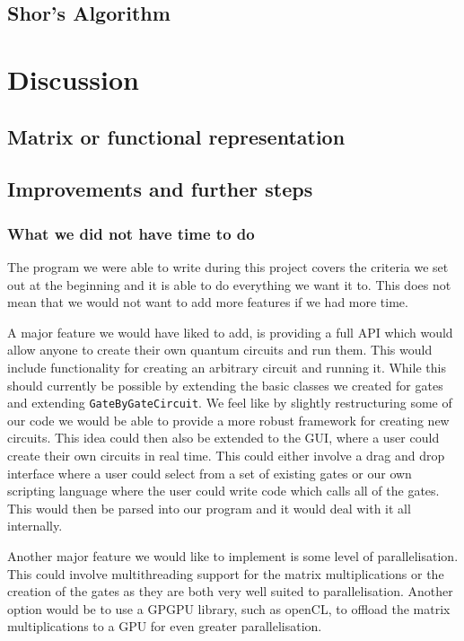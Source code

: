 \documentclass[bibliography=totocnumbered, 10pt]{article}
\theoremstyle{NoticeStyle}
\begin{document}
\subsection{Shor's Algorithm}\label{sec:Shor}


%
\section{Discussion}\label{sec:Discussion}

\subsection{Matrix or functional representation}

\subsection{Improvements and further steps}
\subsubsection{What we did not have time to do}
The program we were able to write during this project covers the criteria we set out at the beginning and it is able to do everything we want it to. This does not mean that we would not want to add more features if we had more time.

A major feature we would have liked to add, is providing a full API which would allow anyone to create their own quantum circuits and run them. This would include functionality for creating an arbitrary circuit and running it. While this should currently be possible by extending the basic classes we created for gates and extending \texttt{GateByGateCircuit}. We feel like by slightly restructuring some of our code we would be able to provide a more robust framework for creating new circuits. This idea could then also be extended to the GUI, where a user could create their own circuits in real time. This could either involve a drag and drop interface where a user could select from a set of existing gates or our own scripting language where the user could write code which calls all of the gates. This would then be parsed into our program and it would deal with it all internally.

Another major feature we would like to implement is some level of parallelisation. This could involve multithreading support for the matrix multiplications or the creation of the gates as they are both very well suited to parallelisation. Another option would be to use a GPGPU library, such as openCL, to offload the matrix multiplications to a GPU for even greater parallelisation.
\end{document}
